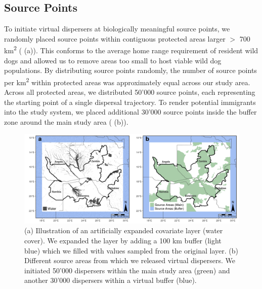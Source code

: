 \documentclass[abstract=on,10pt,a4paper,bibliography=totocnumbered]{article}
\begin{document}
\subsection{Source Points}
To initiate virtual dispersers at biologically meaningful source points, we
randomly placed source points within contiguous protected areas larger \(>\) 700
km\textsuperscript{2} ( (a)). This conforms to the average
home range requirement of resident wild dogs \citep{Pomilia.2015} and allowed us
to remove areas too small to host viable wild dog populations. By distributing
source points randomly, the number of source points per km\textsuperscript{2}
within protected areas was approximately equal across our study area. Across all
protected areas, we distributed 50'000 source points, each representing the
starting point of a single dispersal trajectory. To render potential immigrants
into the study system, we placed additional 30'000 source points inside the
buffer zone around the main study area ( (b)).

\begin{figure}[htbp]
  \begin{center}
    \includegraphics[width = \textwidth]{99_SourceAreas.png}
    \caption{(a) Illustration of an artificially expanded covariate layer (water
    cover). We expanded the layer by adding a 100 km buffer (light blue) which
    we filled with values sampled from the original layer. (b) Different source
    areas from which we released virtual dispersers. We initiated 50'000
    dispersers within the main study area (green) and another 30'000 dispersers
    within a virtual buffer (blue).}
    \label{SourcePoints}
  \end{center}
\end{figure}
\end{document}
